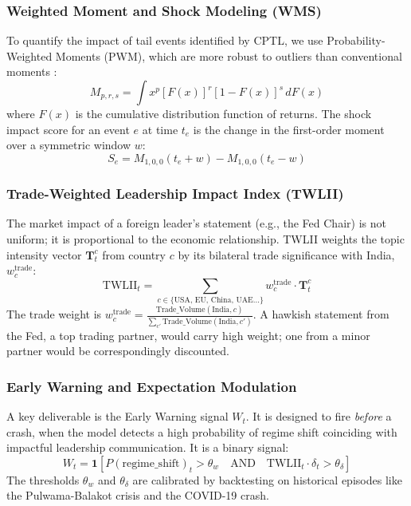 \documentclass[11pt]{article}
\begin{document}
\subsubsection{Weighted Moment and Shock Modeling (WMS)}
To quantify the impact of tail events identified by CPTL, we use Probability-Weighted Moments (PWM), which are more robust to outliers than conventional moments \cite{kumar2024}:
\begin{equation}
M_{p,r,s} = \int x^p [F(x)]^r [1 - F(x)]^s \, dF(x)
\label{eq:pwm}
\end{equation}
where $F(x)$ is the cumulative distribution function of returns. The shock impact score for an event $e$ at time $t_e$ is the change in the first-order moment over a symmetric window $w$:
\begin{equation}
S_e = M_{1,0,0}(t_e + w) - M_{1,0,0}(t_e - w)
\label{eq:shock_score}
\end{equation}

\subsubsection{Trade-Weighted Leadership Impact Index (TWLII)}
The market impact of a foreign leader's statement (e.g., the Fed Chair) is not uniform; it is proportional to the economic relationship. TWLII weights the topic intensity vector $\mathbf{T}_t^c$ from country $c$ by its bilateral trade significance with India, $w_c^{\text{trade}}$:
\begin{equation}
\text{TWLII}_t = \sum_{c \in \{\text{USA, EU, China, UAE...}\}} w_c^{\text{trade}} \cdot \mathbf{T}_t^c
\label{eq:twlii}
\end{equation}
The trade weight is $w_c^{\text{trade}} = \frac{\text{Trade\_Volume}(\text{India}, c)}{\sum_{c'} \text{Trade\_Volume}(\text{India}, c')}$. A hawkish statement from the Fed, a top trading partner, would carry high weight; one from a minor partner would be correspondingly discounted.

\subsubsection{Early Warning and Expectation Modulation}
A key deliverable is the Early Warning signal $W_t$. It is designed to fire \textit{before} a crash, when the model detects a high probability of regime shift coinciding with impactful leadership communication. It is a binary signal:
\begin{equation}
W_t = \mathbf{1}\left[P(\text{regime\_shift})_t > \theta_w \quad \text{AND} \quad \text{TWLII}_t \cdot \delta_t > \theta_\delta\right]
\label{eq:early_warning}
\end{equation}
The thresholds $\theta_w$ and $\theta_\delta$ are calibrated by backtesting on historical episodes like the Pulwama-Balakot crisis and the COVID-19 crash.
\end{document}
